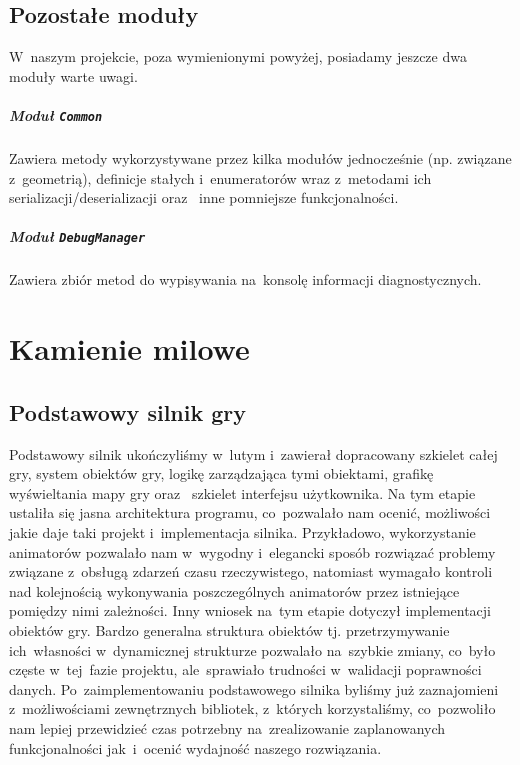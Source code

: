 \documentclass[licencjacka]{pracamgr}
\begin{document}
  \section{Pozostałe moduły}
    W~naszym projekcie, poza wymienionymi powyżej, posiadamy jeszcze dwa moduły warte uwagi.
    \paragraph{Moduł \texttt{Common}}
      Zawiera metody wykorzystywane przez kilka modułów jednocześnie (np. związane z~geometrią), definicje stałych i~enumeratorów
      wraz z~metodami ich serializacji/deserializacji oraz~ inne pomniejsze funkcjonalności.
    \paragraph{Moduł \texttt{DebugManager}}
      Zawiera zbiór metod do wypisywania na~konsolę informacji diagnostycznych.

  \chapter{Kamienie milowe}
    \section{Podstawowy silnik gry}
    Podstawowy silnik ukończyliśmy w~lutym i~zawierał dopracowany szkielet całej gry, system obiektów gry,
    logikę zarządzająca tymi obiektami, grafikę wyświeltania mapy gry oraz~ szkielet interfejsu użytkownika.
    Na tym etapie ustaliła się jasna architektura programu, co~pozwalało nam ocenić, możliwości jakie
    daje taki projekt i~implementacja silnika. Przykładowo, wykorzystanie animatorów pozwalało nam w~wygodny
    i~elegancki sposób rozwiązać problemy związane z~obsługą zdarzeń czasu rzeczywistego, natomiast wymagało kontroli
    nad kolejnością wykonywania poszczególnych animatorów przez istniejące pomiędzy nimi zależności. Inny wniosek
    na~tym etapie dotyczył implementacji obiektów gry. Bardzo generalna struktura obiektów tj. przetrzymywanie
    ich~własności w~dynamicznej strukturze pozwalało na~szybkie zmiany, co~było częste w~tej~fazie projektu,
    ale~sprawiało trudności w~walidacji poprawności danych.
    Po~zaimplementowaniu podstawowego silnika byliśmy już zaznajomieni z~możliwościami zewnętrznych bibliotek,
    z~których korzystaliśmy, co~pozwoliło nam lepiej przewidzieć czas potrzebny na~zrealizowanie zaplanowanych
    funkcjonalności jak~i~ocenić wydajność naszego rozwiązania.
\end{document}
